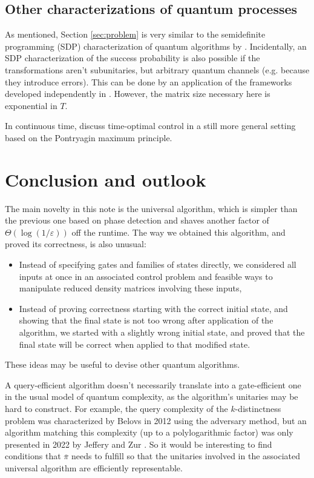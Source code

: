 \documentclass{article}
\begin{document}
\subsection{Other characterizations of quantum processes}

As mentioned, Section \ref{sec:problem} is very similar to the semidefinite programming (SDP) characterization of quantum algorithms by \cite{BarnumQuantum, Barnum2007Semidefinite}. Incidentally, an SDP characterization of the success probability is also possible if the transformations aren't subunitaries, but arbitrary quantum channels (e.g. because they introduce errors). This can be done by an application of the frameworks developed independently in \cite{Gutoski2007Toward, Chiribella2009Theoretical}. However, the matrix size necessary here is exponential in $\displaystyle T.$



In continuous time, \cite{Khaneja2001Time} discuss time-optimal control in a still more general setting based on the Pontryagin maximum principle.


\section{Conclusion and outlook}

The main novelty in this note is the universal algorithm, which is simpler than the previous one based on phase detection \cite{Lee2011Quantum, belovs2015variations} and shaves another factor of $\Theta\left(\log(1/\varepsilon)\right)$ off the runtime. The way we obtained this algorithm, and proved its correctness, is also unusual:
\begin{itemize}
\item Instead of specifying gates and families of states directly, we considered all inputs at once in an associated control problem and feasible ways to manipulate reduced density matrices involving these inputs,
\item Instead of proving correctness starting with the correct initial state, and showing that the final state is not too wrong after application of the algorithm, we started with a slightly wrong initial state, and proved that the final state will be correct when applied to that modified state.
\end{itemize}

These ideas may be useful to devise other quantum algorithms.



A query-efficient algorithm doesn't necessarily translate into a gate-efficient one in the usual model of quantum complexity, as the algorithm's unitaries may be hard to construct. For example, the query complexity of the $\displaystyle k$-distinctness problem was characterized by Belovs in 2012 \cite{belovskdistinctness} using the adversary method, but an algorithm matching this complexity (up to a polylogarithmic factor) was only presented in 2022 by Jeffery and Zur \cite{Jeffery2022Multidimensional}. So it would be interesting to find conditions that $\displaystyle \overline{\pi }$ needs to fulfill so that the unitaries involved in the associated universal algorithm are efficiently representable.

\printbibliography
\end{document}
